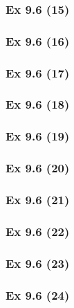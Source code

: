 \subsubsection{Ex 9.6 (15)}\label{sec:Ex_9.6.15}

\subsubsection{Ex 9.6 (16)}\label{sec:Ex_9.6.16}

\subsubsection{Ex 9.6 (17)}\label{sec:Ex_9.6.17}

\subsubsection{Ex 9.6 (18)}\label{sec:Ex_9.6.18}

\subsubsection{Ex 9.6 (19)}\label{sec:Ex_9.6.19}

\subsubsection{Ex 9.6 (20)}\label{sec:Ex_9.6.20}

\newpage		%

\subsubsection{Ex 9.6 (21)}\label{sec:Ex_9.6.21}

\subsubsection{Ex 9.6 (22)}\label{sec:Ex_9.6.22}

\subsubsection{Ex 9.6 (23)}\label{sec:Ex_9.6.23}

\subsubsection{Ex 9.6 (24)}\label{sec:Ex_9.6.24}

